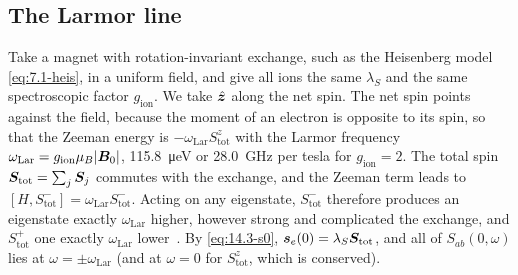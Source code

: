 \subsection{The Larmor line}\label{sec:14.3-larmor}

Take a magnet with rotation-invariant exchange, such as the Heisenberg model \cref{eq:7.1-heis}, in a uniform field, and give all ions the same $\lambda_S$ and the same spectroscopic factor $g_{\mathrm{ion}}$. We take $\hat{\bm{z}}$ along the net spin. The net spin points against the field, because the moment of an electron is opposite to its spin, so that the Zeeman energy is $-\omega_{\mathrm{Lar}}S^z_{\mathrm{tot}}$ with the Larmor frequency $\omega_{\mathrm{Lar}} = g_{\mathrm{ion}}\mu_B|\bm{B}_0|$, \SI{115.8}{\micro eV} or \SI{28.0}{GHz} per tesla for $g_{\mathrm{ion}} = 2$. The total spin $\bm{S}_{\mathrm{tot}} = \sum_j\bm{S}_j$ commutes with the exchange, and the Zeeman term leads to $[H, S^-_{\mathrm{tot}}] = \omega_{\mathrm{Lar}}S^-_{\mathrm{tot}}$. Acting on any eigenstate, $S^-_{\mathrm{tot}}$ therefore produces an eigenstate exactly $\omega_{\mathrm{Lar}}$ higher, however strong and complicated the exchange, and $S^+_{\mathrm{tot}}$ one exactly $\omega_{\mathrm{Lar}}$ lower~\cite[Eqs.~(2.4), (2.5)]{oshikawa2002electron}. By \cref{eq:14.3-s0}, $\bm{s}_e(0) = \lambda_S\bm{S}_{\mathrm{tot}}$, and all of $S_{ab}(0,\omega)$ lies at $\omega = \pm\omega_{\mathrm{Lar}}$ (and at $\omega = 0$ for $S^z_{\mathrm{tot}}$, which is conserved).


